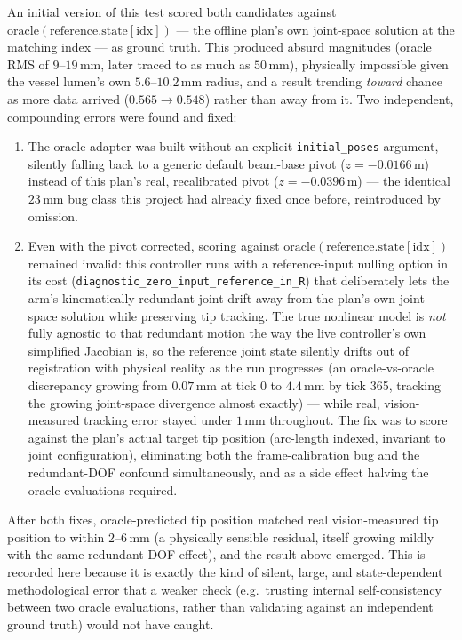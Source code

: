 \documentclass[journal]{IEEEtran}
\begin{document}
An initial version of this test scored both candidates against
$\mathrm{oracle}(\mathrm{reference.state}[\mathrm{idx}])$ --- the
offline plan's own joint-space solution at the matching index --- as
ground truth. This produced absurd magnitudes (oracle RMS of
$9$--$19\,\mathrm{mm}$, later traced to as much as $50\,\mathrm{mm}$),
physically impossible given the vessel lumen's own
$5.6$--$10.2\,\mathrm{mm}$ radius, and a result trending \emph{toward}
chance as more data arrived ($0.565\to0.548$) rather than away from
it. Two independent, compounding errors were found and fixed:
\begin{enumerate}
\item The oracle adapter was built without an explicit
  \texttt{initial\_poses} argument, silently falling back to a
  generic default beam-base pivot ($z{=}{-}0.0166\,\mathrm{m}$) instead
  of this plan's real, recalibrated pivot
  ($z{=}{-}0.0396\,\mathrm{m}$) --- the identical $23\,\mathrm{mm}$
  bug class this project had already fixed once before, reintroduced
  by omission.
\item Even with the pivot corrected, scoring against
  $\mathrm{oracle}(\mathrm{reference.state}[\mathrm{idx}])$ remained
  invalid: this controller runs with a reference-input nulling option
  in its cost (\texttt{diagnostic\_zero\_input\_reference\_in\_R}) that
  deliberately lets the arm's kinematically redundant joint drift away
  from the plan's own joint-space solution while preserving tip
  tracking. The true nonlinear model is \emph{not} fully agnostic to
  that redundant motion the way the live controller's own simplified
  Jacobian is, so the reference joint state silently drifts out of
  registration with physical reality as the run progresses (an
  oracle-vs-oracle discrepancy growing from $0.07\,\mathrm{mm}$ at
  tick 0 to $4.4\,\mathrm{mm}$ by tick 365, tracking the growing
  joint-space divergence almost exactly) --- while real,
  vision-measured tracking error stayed under $1\,\mathrm{mm}$
  throughout. The fix was to score against the plan's actual target
  tip position (arc-length indexed, invariant to joint
  configuration), eliminating both the frame-calibration bug and the
  redundant-DOF confound simultaneously, and as a side effect halving
  the oracle evaluations required.
\end{enumerate}
After both fixes, oracle-predicted tip position matched real
vision-measured tip position to within $2$--$6\,\mathrm{mm}$ (a
physically sensible residual, itself growing mildly with the same
redundant-DOF effect), and the result above emerged. This is recorded
here because it is exactly the kind of silent, large, and
state-dependent methodological error that a weaker check (e.g.\
trusting internal self-consistency between two oracle evaluations,
rather than validating against an independent ground truth) would not
have caught.
\end{document}
